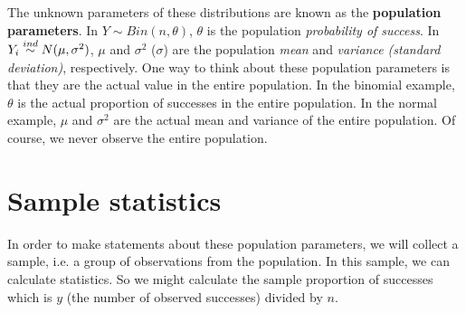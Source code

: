 The unknown parameters of these distributions are known as the {\bf population 
parameters}.
In $Y\sim Bin(n,\theta)$, $\theta$ is the  
population \emph{probability of success}.
In $Y_i\stackrel{ind}{\sim} N(\mu,\sigma^2)$, $\mu$ and $\sigma^2$ ($\sigma$) are the 
population \emph{mean} and \emph{variance (standard deviation)}, respectively.
One way to think about these population parameters is that they are the actual
value in the entire population.
In the binomial example,
$\theta$ is the actual proportion of successes in the entire population.
In the normal example, 
$\mu$ and $\sigma^2$ are the actual mean and variance of the entire population.
Of course, we never observe the entire population.

\section{Sample statistics}

In order to make statements about these population parameters, 
we will collect a sample, 
i.e. a group of observations from the population.
In this sample, 
we can calculate statistics. 
So we might calculate the sample proportion of successes which is $y$ 
(the number of observed successes) divided by $n$.
